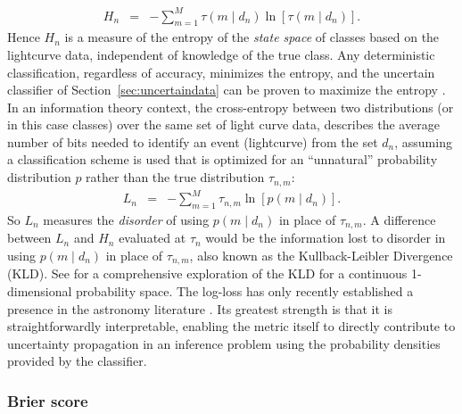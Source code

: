 \begin{eqnarray}
  \label{eq:entropy}
  H_{n} &=& -\sum_{m=1}^{M} \tau(m \mid d_{n}) \ln[\tau(m \mid d_{n})].
\end{eqnarray}
Hence $H_n$ is a measure of the entropy of the \textit{state space} of classes based on the lightcurve data, independent of knowledge of the true class. Any deterministic classification, regardless of accuracy, minimizes the entropy, and the uncertain classifier of Section~\ref{sec:uncertaindata} can be proven to maximize the entropy \cite{murphy2012}.
In an information theory context, the cross-entropy between two distributions (or in this case classes) over the same set of light curve data, describes the average number of bits needed to identify an event (lightcurve) from the set $d_n$, assuming a classification scheme is used that is optimized for an ``unnatural'' probability distribution $p$ rather than the true distribution $\tau_{n,m}$:
\begin{eqnarray}
  \label{eq:logloss}
  L_{n} &=& -\sum_{m=1}^{M}\tau_{n, m}\ln[p(m \mid d_{n})].
\end{eqnarray}
So $L_n$ measures the \textit{disorder} of using $p(m \mid d_{n})$ in place of $\tau_{n, m}$.
A difference between $L_{n}$ and $H_{n}$ evaluated at $\tau_{n}$ would be the information lost to disorder in using $p(m \mid d_{n})$ in place of $\tau_{n, m}$, also known as the Kullback-Leibler Divergence (KLD).
See \cite{2018AJ....156...35M} for a comprehensive exploration of the KLD for a continuous 1-dimensional probability space.
The log-loss has only recently established a presence in the astronomy literature \citep{hon_deep_2017, hon_deep_2018}.
Its greatest strength is that it is straightforwardly interpretable, enabling the metric itself to directly contribute to uncertainty propagation in an inference problem using the probability densities provided by the classifier.

\subsubsection{Brier score}
\label{sec:brier}

